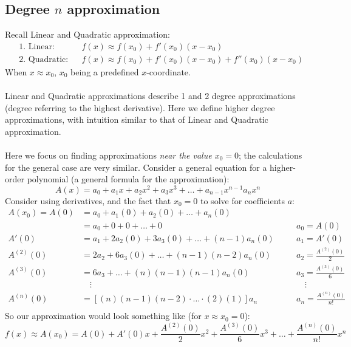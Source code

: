 \documentclass{report}
\begin{document}
\subsection{Degree $n$ approximation} %
Recall Linear and Quadratic approximation:
\begin{align*}
&\text{1. Linear:}&&f(x)\approx f(x_0)+f'(x_0)(x-x_0)\\
&\text{2. Quadratic:}&&f(x)\approx f(x_0)+f'(x_0)(x-x_0)+f''(x_0)(x-x_0)
\end{align*}
When $x\approx x_0$, $x_0$ being a predefined $x$-coordinate.\\
\vspace{1mm}\\
Linear and Quadratic approximations describe 1 and 2 degree approximations
(degree referring to the highest derivative). 
Here we define higher degree approximations, with intuition similar
to that of Linear and Quadratic approximation.\\
\vspace{1mm}\\
Here we focus on finding approximations \textit{near the value $x_0=0$}; the calculations
 for the general case are very similar. Consider a general equation for a 
higher-order polynomial (a general formula for the approximation):
\begin{equation*}
A(x)=a_0+a_1x+a_2x^2+a_3x^3+\ldots+a_{n-1}x^{n-1}a_nx^n
\end{equation*}
Consider using derivatives, and the fact that $x_0=0$ to solve for coefficients $a$:
\begin{align*}
A(x_0)=A(0)&=a_0+a_1(0)+a_2(0)+\ldots+a_n(0)\\
&=a_0+0+0+\ldots+0\quad&&a_0=A(0)\\
A'(0)&=a_1+2a_2(0)+3a_3(0)+\ldots+(n-1)a_n(0)\quad&&a_1=A'(0)\\
A^{(2)}(0)&=2a_2+6a_3(0)+\ldots+(n-1)(n-2)a_n(0)\quad&&a_2=\frac{A^{(2)}(0)}{2}\\
A^{(3)}(0)&=6a_3+\ldots+(n)(n-1)(n-1)a_n(0)\quad&&a_3=\frac{A^{(3)}(0)}{6}\\
&\quad\vdots&&\quad\vdots\\
A^{(n)}(0)&=[(n)(n-1)(n-2)\cdot\ldots\cdot(2)(1)]a_n\quad&&a_n=\frac{A^{(n)}(0)}{n!}\\
\end{align*}
So our approximation would look something like (for $x\approx x_0=0$):
\begin{equation*}
f(x)\approx A(x_0)=A(0)+A'(0)x+\frac{A^{(2)}(0)}{2}x^2+\frac{A^{(3)}(0)}{6}x^3+
\ldots+\frac{A^{(n)}(0)}{n!}x^n
\end{equation*}
\end{document}
